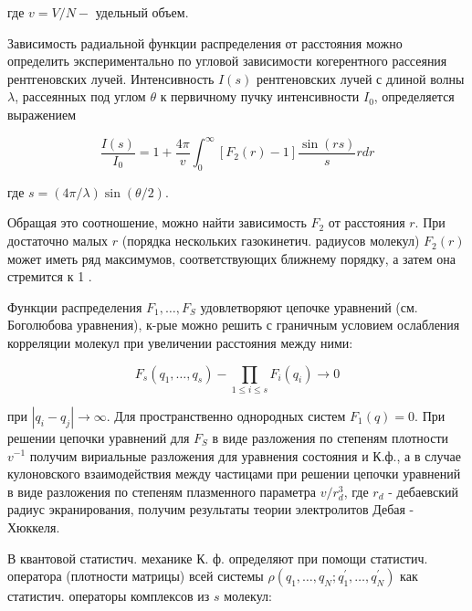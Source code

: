 \documentclass[10pt]{article}
\begin{document}
где $v=V / N-$ удельный объем.



Зависимость радиальной функции распределения от расстояния можно определить экспериментально по угловой зависимости когерентного рассеяния рентгеновских лучей. Интенсивность $I(s)$ рентгеновских лучей с длиной волны $\lambda$, рассеянных под углом $\theta$ к первичному пучку интенсивности $I_{0}$, определяется выражением



\[

\frac{I(s)}{I_{0}}=1+\frac{4 \pi}{v} \int_{0}^{\infty}\left[F_{2}(r)-1\right] \frac{\sin (r s)}{s} r d r

\]



где $s=(4 \pi / \lambda) \sin (\theta / 2)$.



Обращая это соотношение, можно найти зависимость $F_{2}$ от расстояния $r$. При достаточно малых $r$ (порядка нескольких газокинетич. радиусов молекул) $F_{2}(r)$ может иметь ряд максимумов, соответствующих ближнему порядку, а затем она стремится к 1 .



Функции распределения $F_{1}, \ldots, F_{S}$ удовлетворяют цепочке уравнений (см. Боголюбова уравнения), к-рые можно решить с граничным условием ослабления корреляции молекул при увеличении расстояния между ними:



\[

F_{s}\left(q_{1}, \ldots, q_{s}\right)-\prod_{1 \leqslant i \leqslant s} F_{i}\left(q_{i}\right) \rightarrow 0

\]



при $\left|q_{i}-q_{j}\right| \rightarrow \infty$. Для пространственно однородных систем $F_{1}(q)=0$. При решении цепочки уравнений для $F_{S}$ в виде разложения по степеням плотности $v^{-1}$ получим вириальные разложения для уравнения состояния и К.ф., а в случае кулоновского взаимодействия между частицами при решении цепочки уравнений в виде разложения по степеням плазменного параметра $v / r_{d}^{3}$, где $r_{d}$ - дебаевский радиус экранирования, получим результаты теории электролитов Дебая - Хюккеля.



В квантовой статистич. механике К. ф. определяют при помощи статистич. оператора (плотности матрицы) всей системы $\rho\left(q_{1}, \ldots, q_{N} ; q_{1}^{\prime}, \ldots, q_{N}^{\prime}\right)$ как статистич. операторы комплексов из $s$ молекул:
\end{document}
